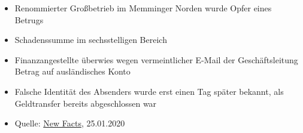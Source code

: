 \begin{frame}
\begin{itemize}
  \item Renommierter Großbetrieb im Memminger Norden wurde Opfer eines Betrugs
  \item Schadenssumme im sechsstelligen Bereich
  \item Finanzangestellte überwies wegen vermeintlicher E-Mail der Geschäftsleitung Betrag auf ausländisches Konto
  \item Falsche Identität des Absenders wurde erst einen Tag später bekannt, als Geldtransfer bereits abgeschlossen war
  \item Quelle: \href{https://www.new-facts.eu/memmingen-schadenstraechtiger-betrug-mittels-fingierter-e-mails-sechsstelliger-schadensbetrag-354520.html}{New Facts}, 25.01.2020
\end{itemize}
\end{frame}


